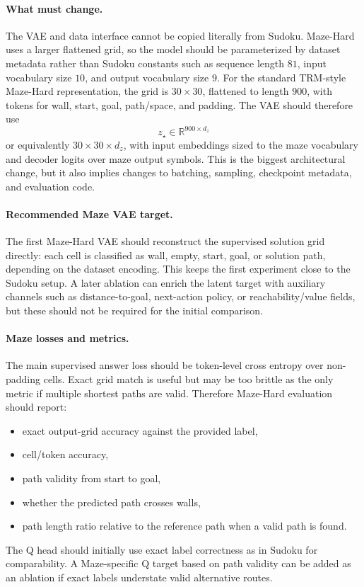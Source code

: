 \documentclass[11pt]{article}
\begin{document}
\paragraph{What must change.}
The VAE and data interface cannot be copied literally from Sudoku. Maze-Hard uses a larger flattened grid, so the model should be parameterized by dataset metadata rather than Sudoku constants such as sequence length \(81\), input vocabulary size \(10\), and output vocabulary size \(9\). For the standard TRM-style Maze-Hard representation, the grid is \(30\times 30\), flattened to length \(900\), with tokens for wall, start, goal, path/space, and padding. The VAE should therefore use
\[
    z_\star \in \mathbb R^{900\times d_z}
\]
or equivalently \(30\times 30\times d_z\), with input embeddings sized to the maze vocabulary and decoder logits over maze output symbols. This is the biggest architectural change, but it also implies changes to batching, sampling, checkpoint metadata, and evaluation code.

\paragraph{Recommended Maze VAE target.}
The first Maze-Hard VAE should reconstruct the supervised solution grid directly: each cell is classified as wall, empty, start, goal, or solution path, depending on the dataset encoding. This keeps the first experiment close to the Sudoku setup. A later ablation can enrich the latent target with auxiliary channels such as distance-to-goal, next-action policy, or reachability/value fields, but these should not be required for the initial comparison.

\paragraph{Maze losses and metrics.}
The main supervised answer loss should be token-level cross entropy over non-padding cells. Exact grid match is useful but may be too brittle as the only metric if multiple shortest paths are valid. Therefore Maze-Hard evaluation should report:
\begin{itemize}[itemsep=0pt]
    \item exact output-grid accuracy against the provided label,
    \item cell/token accuracy,
    \item path validity from start to goal,
    \item whether the predicted path crosses walls,
    \item path length ratio relative to the reference path when a valid path is found.
\end{itemize}
The Q head should initially use exact label correctness as in Sudoku for comparability. A Maze-specific Q target based on path validity can be added as an ablation if exact labels understate valid alternative routes.
\end{document}
